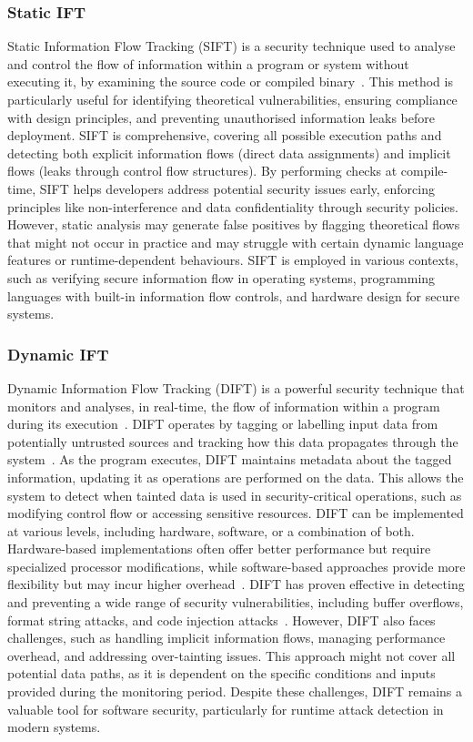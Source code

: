 \subsubsection{Static IFT}
Static Information Flow Tracking (SIFT) is a security technique used to analyse and control the flow of information within a program or system without executing it, by examining the source code or compiled binary~\cite{HAK-21-acmcsur}. This method is particularly useful for identifying theoretical vulnerabilities, ensuring compliance with design principles, and preventing unauthorised information leaks before deployment. SIFT is comprehensive, covering all possible execution paths and detecting both explicit information flows (direct data assignments) and implicit flows (leaks through control flow structures). By performing checks at compile-time, SIFT helps developers address potential security issues early, enforcing principles like non-interference and data confidentiality through security policies. However, static analysis may generate false positives by flagging theoretical flows that might not occur in practice and may struggle with certain dynamic language features or runtime-dependent behaviours. SIFT is employed in various contexts, such as verifying secure information flow in operating systems, programming languages with built-in information flow controls, and hardware design for secure systems.

\subsubsection{Dynamic IFT}
Dynamic Information Flow Tracking (DIFT) is a powerful security technique that monitors and analyses, in real-time, the flow of information within a program during its execution~\cite{CGDJ-21-micromac}. DIFT operates by tagging or labelling input data from potentially untrusted sources and tracking how this data propagates through the system~\cite{SLD-04-sigplan}. As the program executes, DIFT maintains metadata about the tagged information, updating it as operations are performed on the data. This allows the system to detect when tainted data is used in security-critical operations, such as modifying control flow or accessing sensitive resources. DIFT can be implemented at various levels, including hardware, software, or a combination of both. Hardware-based implementations often offer better performance but require specialized processor modifications, while software-based approaches provide more flexibility but may incur higher overhead~\cite{CGDJ-21-micromac}. DIFT has proven effective in detecting and preventing a wide range of security vulnerabilities, including buffer overflows, format string attacks, and code injection attacks~\cite{SLD-04-sigplan}. However, DIFT also faces challenges, such as handling implicit information flows, managing performance overhead, and addressing over-tainting issues.
This approach might not cover all potential data paths, as it is dependent on the specific conditions and inputs provided during the monitoring period.
Despite these challenges, DIFT remains a valuable tool for software security, particularly for runtime attack detection in modern systems.

